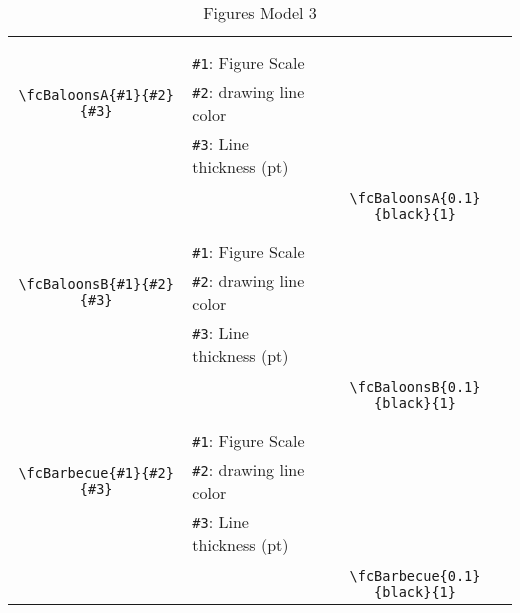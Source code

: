 \documentclass[x11names]{article}
\begin{document}
\begin{table}[H]
\begin{tabular}{|c|l|c|}
	&&\multirow{5}{*}{\fcBaloonsA{0.1}{black}{1}}\\	&&\\	&\verb|#1|: Figure Scale &\\	\verb|\fcBaloonsA{#1}{#2}{#3}|&	\verb|#2|: drawing line color &\\	&\verb|#3|: Line thickness (pt) &\\ &&\\&&	\verb|\fcBaloonsA{0.1}{black}{1}|\\\hline 	
	&&\multirow{5}{*}{\fcBaloonsB{0.1}{black}{1}}\\	&&\\	&\verb|#1|: Figure Scale &\\	\verb|\fcBaloonsB{#1}{#2}{#3}|&	\verb|#2|: drawing line color &\\	&\verb|#3|: Line thickness (pt) &\\ &&\\&&	\verb|\fcBaloonsB{0.1}{black}{1}|\\\hline 	
	&&\multirow{5}{*}{\fcBarbecue{0.1}{black}{1}}\\	&&\\	&\verb|#1|: Figure Scale &\\	\verb|\fcBarbecue{#1}{#2}{#3}|&	\verb|#2|: drawing line color &\\	&\verb|#3|: Line thickness (pt) &\\ &&\\&&	\verb|\fcBarbecue{0.1}{black}{1}|\\\hline 	\hline\end{tabular}\caption{Figures Model 3}\label{tab3}\end{table}
\end{document}
